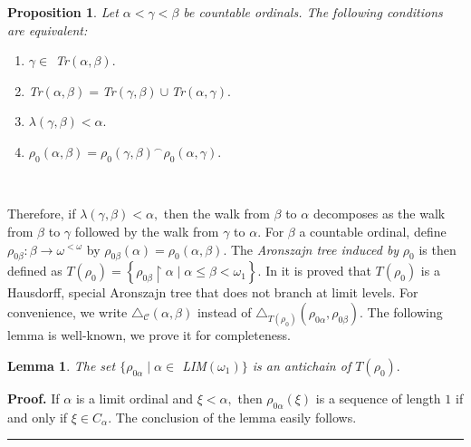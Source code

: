\documentclass{article}
\newtheorem{lemma}[theorem]{Lemma}
\newtheorem{proposition}[theorem]{Proposition}
\newenvironment{proof}[1][Proof]{\noindent\textbf{#1.} }{\ \rule{0.5em}{0.5em}}
\begin{document}
\begin{proposition}
Let $\alpha<\gamma<\beta$ be countable ordinals. The following conditions are
equivalent: \label{Prop juntar trazas}

\begin{enumerate}
\item $\gamma\in$ \textsf{Tr}$\left(  \alpha,\beta\right)  .$

\item \textsf{Tr}$\left(  \alpha,\beta\right)  =$\textsf{Tr}$\left(
\gamma,\beta\right)  \cup$\textsf{Tr}$\left(  \alpha,\gamma\right)  .$

\item $\lambda\left(  \gamma,\beta\right)  <\alpha.$

\item $\rho_{0}\left(  \alpha,\beta\right)  =\rho_{0}\left(  \gamma
,\beta\right)  ^{\frown}\rho_{0}\left(  \alpha,\gamma\right)  .$
\end{enumerate}
\end{proposition}

\qquad\ \ \ \ \ \ \ \ 

Therefore, if $\lambda\left(  \gamma,\beta\right)  <\alpha,$ then the walk
from $\beta$ to $\alpha$ decomposes as the walk from $\beta$ to $\gamma$
followed by the walk from $\gamma$ to $\alpha.$ For $\beta$ a countable
ordinal, define $\rho_{0\beta}:\beta\longrightarrow\omega^{<\omega}$ by
$\rho_{0\beta}\left(  \alpha\right)  =\rho_{0}\left(  \alpha,\beta\right)  .$
The \emph{Aronszajn tree induced by} $\rho_{0}$ is then defined as $T\left(
\rho_{0}\right)  =\left\{  \rho_{0\beta}\upharpoonright\alpha\mid\alpha
\leq\beta<\omega_{1}\right\}  .$ In \cite{Walks} it is proved that $T\left(
\rho_{0}\right)  $ is a Hausdorff, special Aronszajn tree that does not branch
at limit levels. For convenience, we write $\triangle_{\mathcal{C}}\left(
\alpha,\beta\right)  $ instead of $\triangle_{T\left(  \rho_{0}\right)
}\left(  \rho_{0\alpha},\rho_{0\beta}\right)  .$ The following lemma is
well-known, we prove it for completeness.

\begin{lemma}
The set $\{\rho_{0\alpha}\mid\alpha\in$ \textsf{LIM}$\left(  \omega
_{1}\right)  \}$ is an antichain of $T\left(  \rho_{0}\right)  .$
\label{Lema limite anticadena}
\end{lemma}

\begin{proof}
If $\alpha$ is a limit ordinal and $\xi<\alpha,$ then $\rho_{0\alpha}\left(
\xi\right)  $ is a sequence of length $1$ if and only if $\xi\in C_{\alpha}.$
The conclusion of the lemma easily follows.
\end{proof}
\end{document}
